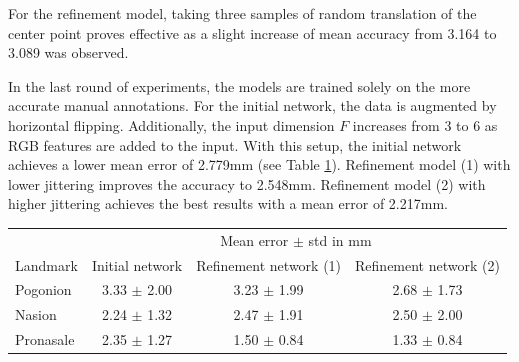 \documentclass[class=article, crop=false]{standalone}
\begin{document}
For the refinement model, taking three samples of random translation of the center point proves effective as a slight increase of mean accuracy from 3.164 to 3.089 was observed.

In the last round of experiments, the models are trained solely on the more accurate manual annotations. For the initial network, the data is augmented by horizontal flipping. Additionally, the input dimension $F$ increases from 3 to 6 as RGB features are added to the input. With this setup, the initial network achieves a lower mean error of 2.779mm (see Table \ref{table:horizflip_rgb}). Refinement model (1) with lower jittering improves the accuracy to 2.548mm. Refinement model (2) with higher jittering achieves the best results with a mean error of 2.217mm.

\begin{table}[!htbp]
\label{table:horizflip_rgb}
\begin{tabularx}{\textwidth}{l|c|c|c}
\toprule
 & \multicolumn{3}{c}{Mean error $\pm$ std in mm} \\\cmidrule(lr){2-4}
Landmark               & \hspace{0.5cm}Initial network\hspace{0.5cm} &  \hspace{0.5cm}Refinement network (1)   \hspace{0.5cm} & \hspace{0.5cm} Refinement network (2)  \hspace{0.5cm}
\\
\midrule
Pogonion               & 3.33 $\pm$ 2.00 & 3.23 $\pm$ 1.99 & 2.68 $\pm$ 1.73 \\
Nasion                 & 2.24 $\pm$ 1.32 & 2.47 $\pm$ 1.91 & 2.50 $\pm$ 2.00\\  
Pronasale              & 2.35 $\pm$ 1.27 & 1.50 $\pm$ 0.84 & 1.33 $\pm$ 0.84\\

\end{tabularx}
\end{table}
\end{document}
